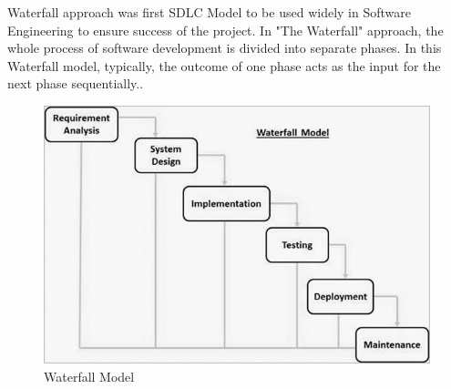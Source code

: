 Waterfall approach was first SDLC Model to be used widely in Software Engineering to ensure success of the project. In "The Waterfall" approach, the whole process of software development is divided into separate phases. In this Waterfall model, typically, the outcome of one phase acts as the input for the next phase sequentially..

\begin{figure}[ht]
\centering
\includegraphics[scale=0.5]{images/sdlc.jpg}
\caption{Waterfall Model}
\end{figure}


